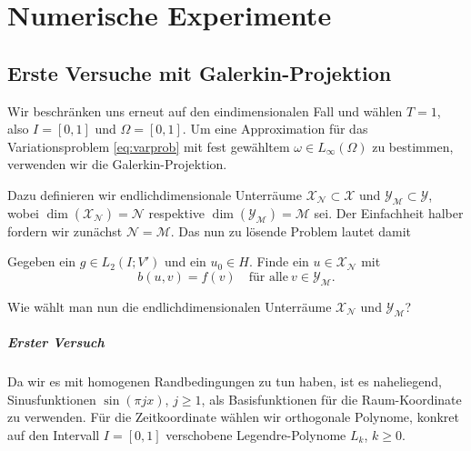 
\chapter{Numerische Experimente} %
\label{cha:numerische_experimente}


\section{Erste Versuche mit Galerkin-Projektion} %
\label{sec:erste_versuche_mit_galerkin_projektion}

Wir beschränken uns erneut auf den eindimensionalen Fall und wählen $T = 1$, also $I = [0, 1]$ und $\Omega = [0 ,1]$.
Um eine Approximation für das Variationsproblem \eqref{eq:varprob} mit fest gewähltem $\omega \in L_{\infty}(\Omega)$ zu bestimmen, verwenden wir die Galerkin-Projektion.

Dazu definieren wir endlichdimensionale Unterräume $\mathcal X_{\mathcal N} \subset \mathcal X$ und $\mathcal Y_{\mathcal M} \subset \mathcal Y$, wobei $\dim(\mathcal X_{\mathcal N}) = \mathcal N$ respektive $\dim(\mathcal Y_{\mathcal M}) = \mathcal M$ sei.
Der Einfachheit halber fordern wir zunächst $\mathcal N = \mathcal M$.
Das nun zu lösende Problem lautet damit

\begin{Problem}
    Gegeben ein $g \in L_{2}(I; V')$ und ein $u_{0} \in H$. Finde ein $u \in \mathcal X_{\mathcal N}$ mit
    \begin{equation}
        \label{eq:varprob_3}
        b(u, v) = f(v) \quad \text{für alle}~v \in \mathcal Y_{\mathcal M}.
    \end{equation}
\end{Problem}

Wie wählt man nun die endlichdimensionalen Unterräume $\mathcal X_{\mathcal N}$ und $\mathcal Y_{\mathcal M}$?

\paragraph{Erster Versuch} %
\label{par:erster_versuch}

Da wir es mit homogenen Randbedingungen zu tun haben, ist es naheliegend, Sinusfunktionen $\sin(\pi j x)$, $j \geq 1$, als Basisfunktionen für die Raum-Koordinate zu verwenden.
Für die Zeitkoordinate wählen wir orthogonale Polynome, konkret auf den Intervall $I = [0, 1]$ verschobene Legendre-Polynome $L_{k}$, $k \geq 0$.

